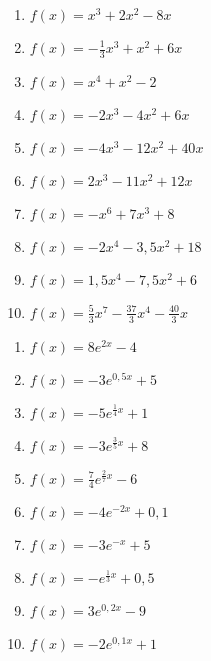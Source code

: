 \begin{minipage}{\textwidth}
	\begin{minipage}{.45\textwidth}
		\begin{Exercise}[title={\raggedright\normalfont Berechne jeweils die von der Funktion und der \(x\)-Achse eingeschlossene Fläche.}, label=flaecheRechnA1]
			\begin{enumerate}[label=\alph*)]
				\item \(f(x)=x^3+2x^2-8x\)
				\item \(f(x)=-\frac{1}{3}x^3+x^2+6x\)
				\item \(f(x)=x^4+x^2-2\)
				\item \(f(x)=-2x^3-4x^2+6x\)
				\item \(f(x)=-4x^3-12x^2+40x\)
				\item \(f(x)=2x^3-11x^2+12x\)
				\item \(f(x)=-x^6+7x^3+8\)
				\item \(f(x)=-2x^4-3,5x^2+18\)
				\item \(f(x)=1,5x^4-7,5x^2+6\)
				\item \(f(x)=\frac{5}{3}x^7-\frac{37}{3}x^4-\frac{40}{3}x\)
			\end{enumerate}
		\end{Exercise}
	\end{minipage}
	\begin{minipage}{.1\textwidth}
		\phantom{text}
	\end{minipage}
	\begin{minipage}{.45\textwidth}
		\begin{Exercise}[title={\raggedright\normalfont Berechne jeweils die von der Funktion und den Koordinatenachsen eingeschlossene Fläche.}, label=flaecheRechnA2]
			\begin{enumerate}[label=\alph*)]
				\item \(f(x)=8e^{2x}-4\)
				\item \(f(x)=-3e^{0,5x}+5\)
				\item \(f(x)=-5e^{\tfrac{1}{4}x}+1\)
				\item \(f(x)=-3e^{\tfrac{3}{5}x}+8\)
				\item \(f(x)=\tfrac{7}{4}e^{\tfrac{2}{7}x}-6\)
				\item \(f(x)=-4e^{-2x}+0,1\)
				\item \(f(x)=-3e^{-x}+5\)
				\item \(f(x)=-e^{\tfrac{1}{3}x}+0,5\)
				\item \(f(x)= 3e^{0,2x}-9\)
				\item \(f(x)=-2e^{0,1x}+1\)
			\end{enumerate}
		\end{Exercise}
	\end{minipage}
\end{minipage}

